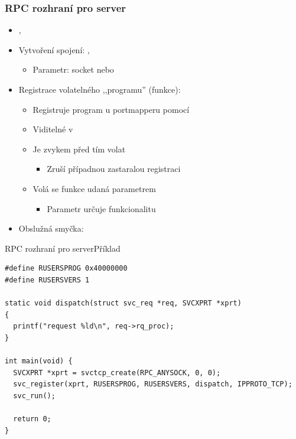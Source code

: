 \begin{frame}
  \frametitle{RPC rozhraní pro server}

  \begin{itemize}
    \item {}, 
    \item Vytvoření spojení: , 
    \begin{itemize}
      \item Parametr: socket nebo 
    \end{itemize}

    \pause
    
    \item Registrace volatelného ,,programu'' (funkce): 
    \begin{itemize}
      \item Registruje program u portmapperu pomocí 
      \item Viditelné v 
      \item Je zvykem před tím volat 
      \begin{itemize}
        \item Zruší případnou zastaralou registraci
      \end{itemize}

      \pause

      \item Volá se funkce udaná parametrem 
      \begin{itemize}
        \item Parametr  určuje funkcionalitu
      \end{itemize}
    \end{itemize}

    \pause

    \item Obslužná smyčka: 
  \end{itemize}

\end{frame}

\begin{frame}[fragile]{RPC rozhraní pro server}{Příklad}

\begin{lstlisting}
#define RUSERSPROG 0x40000000
#define RUSERSVERS 1

static void dispatch(struct svc_req *req, SVCXPRT *xprt)
{
  printf("request %ld\n", req->rq_proc);
}

int main(void) {
  SVCXPRT *xprt = svctcp_create(RPC_ANYSOCK, 0, 0);
  svc_register(xprt, RUSERSPROG, RUSERSVERS, dispatch, IPPROTO_TCP);
  svc_run();

  return 0;
}
\end{lstlisting} %
\end{frame}

